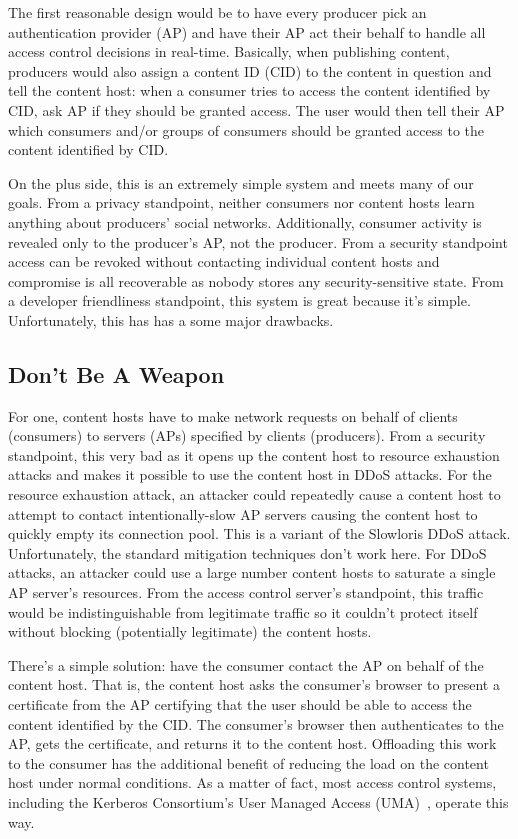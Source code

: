 \documentclass[pdftex,12pt,a4papaer,twoside,notitlepage]{report}
\begin{document}
The first reasonable design would be to have every producer pick an
authentication provider (AP) and have their AP act their behalf to handle all
access control decisions in real-time. Basically, when publishing content,
producers would also assign a content ID (CID) to the content in question and
tell the content host: when a consumer tries to access the content identified by
CID, ask AP if they should be granted access. The user would then tell their AP
which consumers and/or groups of consumers should be granted access to the
content identified by CID.

On the plus side, this is an extremely simple system and meets many of our
goals. From a privacy standpoint, neither consumers nor content hosts learn
anything about producers' social networks. Additionally, consumer activity is
revealed only to the producer's AP, not the producer. From a security standpoint
access can be revoked without contacting individual content hosts and compromise
is all recoverable as nobody stores any security-sensitive state. From a
developer friendliness standpoint, this system is great because it's simple.
Unfortunately, this has has a some major drawbacks.

\subsection{Don't Be A Weapon}

For one, content hosts have to make network requests on behalf of clients
(consumers) to servers (APs) specified by clients (producers). From a security
standpoint, this very bad as it opens up the content host to resource exhaustion
attacks and makes it possible to use the content host in DDoS attacks. For the
resource exhaustion attack, an attacker could repeatedly cause a content host to
attempt to contact intentionally-slow AP servers causing the content host to
quickly empty its connection pool. This is a variant of the Slowloris DDoS
attack\cite{slowloris}. Unfortunately, the standard mitigation techniques don't
work here. For DDoS attacks, an attacker could use a large number content hosts
to saturate a single AP server's resources. From the access control server's
standpoint, this traffic would be indistinguishable from legitimate traffic so
it couldn't protect itself without blocking (potentially legitimate) the content
hosts.

There's a simple solution: have the consumer contact the AP on behalf of the
content host. That is, the content host asks the consumer's browser to present a
certificate from the AP certifying that the user should be able to access the
content identified by the CID. The consumer's browser then authenticates to the
AP, gets the certificate, and returns it to the content host. Offloading this
work to the consumer has the additional benefit of reducing the load on the
content host under normal conditions. As a matter of fact, most access control
systems, including the Kerberos Consortium's User Managed Access
(UMA)~\cite{uma}, operate this way.
\end{document}
